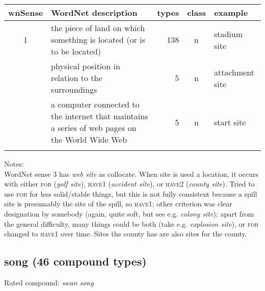 \noindent
\begin{longtable}{c>{\raggedright\arraybackslash}p{5cm}rc>{\raggedright\arraybackslash}p{2cm}}\lsptoprule
{\small wnSense}&WordNet description&types&class&example\\\midrule
1&the piece of land on which something is located (or is to be located)&138&n&stadium site\\\tablevspace
2&physical position in relation to the surroundings&5&n&attachment site\\\tablevspace
3&a computer connected to the internet that maintains a series of web pages on the World Wide Web&5&n&start site\\\lspbottomrule
\end{longtable}
\vspace*{-.2cm}

\noindent
Notes:\\
WordNet sense 3 has \emph{web site} as collocate. When site is used a location, it occurs with either \textsc{for} (\emph{golf site}), \textsc{have1} (\emph{accident site}), or \textsc{have2} (\emph{county site}). Tried to
use \textsc{for} for less solid/stable
 things, but this is not fully consistent because a spill site is
 presumably the site of the spill, so \textsc{have1}; other criterion was clear
 designation by somebody (again, quite soft, but see e.g. \emph{colony site});
 apart from the general difficulty, many things could be both
 (take e.g. \emph{explosion site}), or \textsc{for} changed to \textsc{have1} over time. Sites the county
 has are also sites for the county.
\vspace*{-.3cm}

\subsection{song      (46 compound types)}
Rated compound: \emph{swan song}
\vspace*{-.4cm}


